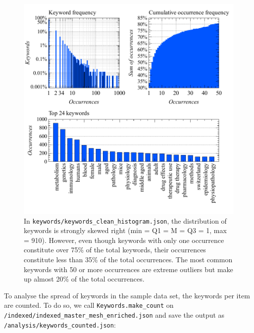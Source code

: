 \begin{figure}
\centering
\includegraphics{images/keywords_clean_histogram_abc.pdf}
\caption{In \texttt{keywords/keywords\_clean\_histogram.json}, the
distribution of keywords is strongly skewed right (min = Q1 = M = Q3 =
1, max = 910). However, even though keywords with only one occurrence
constitute over 75\% of the total keywords, their occurrences constitute
less than 35\% of the total occurrences. The most common keywords with
50 or more occurrences are extreme outliers but make up almost 20\% of
the total occurrences.}
\end{figure}

To analyse the spread of keywords in the sample data set, the keywords
per item are counted. To do so, we call \texttt{Keywords.make\_count} on
\texttt{/indexed/indexed\_master\_mesh\_enriched.json} and save the
output as \texttt{/analysis/keywords\_counted.json}:

\begin{Shaded}
\begin{Highlighting}[]
\OperatorTok{=}\NormalTok{)}
\OperatorTok{=}
\NormalTok{)}
\end{Highlighting}
\end{Shaded}

